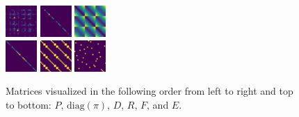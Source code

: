 \documentclass[9pt,twocolumn,twoside]{pnas-report}
\begin{document}
{\begin{figure}[t]\centering%
	\includegraphics[width=0.3\linewidth]{fig/p}
	\includegraphics[width=0.3\linewidth]{fig/pi}
        \includegraphics[width=0.3\linewidth]{fig/d}\\
        \vspace{0.2em}
        \includegraphics[width=0.3\linewidth]{fig/r}
        \includegraphics[width=0.3\linewidth]{fig/f}
        \includegraphics[width=0.3\linewidth]{fig/e}
	\caption{Matrices visualized in the following order from left to right and top to bottom: $P$, $\text{diag}(\pi)$, $D$, $R$, $F$, and $E$.}
        \label{fig:matrices}
\end{figure}

}
\end{document}
